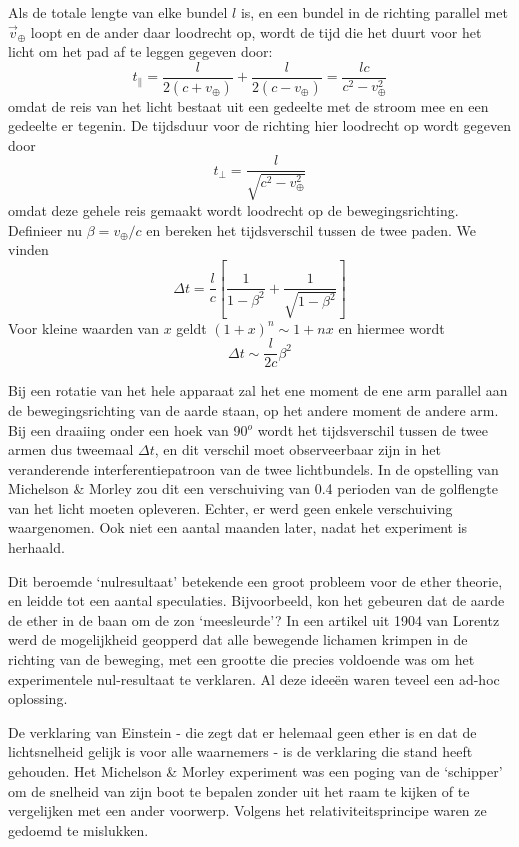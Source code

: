 Als de totale lengte van elke bundel $l$ is, en een bundel in de
richting parallel met $\vec{v}_{\oplus}$ loopt en de ander daar
loodrecht op, wordt de tijd die het duurt voor het licht om het pad af
te leggen gegeven door:
\begin{equation}
t_{\parallel}=\frac{l}{2(c+v_{\oplus})} +\frac{l}{2(c-v_{\oplus})}
=\frac{lc}{c^2-v^2_{\oplus}}
\end{equation}
omdat de reis van het licht bestaat uit een gedeelte met de stroom mee
en een gedeelte er tegenin. De tijdsduur voor de richting hier
loodrecht op wordt gegeven door
\begin{equation}
t_{\perp} = \frac{l}{\sqrt{c^2-v_{\oplus}^2}}
\end{equation}
omdat deze gehele reis gemaakt wordt loodrecht op de bewegingsrichting. Definieer nu $\beta=v_{\oplus}/c$ en bereken het tijdsverschil tussen de twee paden. We vinden
\begin{equation}
\Delta t = \frac{l}{c}\left[ \frac{1}{1-\beta^2} + \frac{1}{\sqrt{1-\beta^2}}   \right]
\end{equation}
Voor kleine waarden van $x$ geldt $(1+x)^n \sim 1+nx$ en hiermee wordt
\begin{equation}
\Delta t \sim \frac{l}{2c} \beta^2
\end{equation}

Bij een rotatie van het hele apparaat  zal het ene moment de ene arm
parallel aan de bewegingsrichting van de aarde staan, op het andere
moment de andere arm. Bij een draaiing onder een hoek van 90$^o$ wordt het
tijdsverschil tussen de twee armen dus tweemaal $\Delta t$, en dit
verschil moet observeerbaar zijn in het veranderende
interferentiepatroon van de twee lichtbundels. In de opstelling van
Michelson \& Morley zou dit een verschuiving van 0.4 perioden van de
golflengte van het licht moeten opleveren. Echter, er werd geen enkele
verschuiving waargenomen. Ook niet een aantal maanden later, nadat het  experiment is herhaald.

Dit beroemde `nulresultaat' betekende een groot probleem voor de ether
theorie, en leidde tot een aantal speculaties. Bijvoorbeeld, kon het
gebeuren dat de aarde de ether in de baan om de zon `meesleurde'? In
een artikel uit 1904 van Lorentz werd de mogelijkheid geopperd dat
alle bewegende lichamen krimpen in de richting van de beweging, met
een grootte die precies voldoende was om het experimentele
nul-resultaat te verklaren. Al deze idee\"en waren teveel een ad-hoc
oplossing.

De verklaring van Einstein - die zegt dat er helemaal geen ether is en
dat de lichtsnelheid gelijk is voor alle waarnemers - is de verklaring
die stand heeft gehouden. Het Michelson \& Morley experiment was een
poging van de `schipper' om de snelheid van zijn boot te bepalen
zonder uit het raam te kijken of te vergelijken met een ander
voorwerp. Volgens het relativiteitsprincipe waren ze gedoemd te
mislukken.



